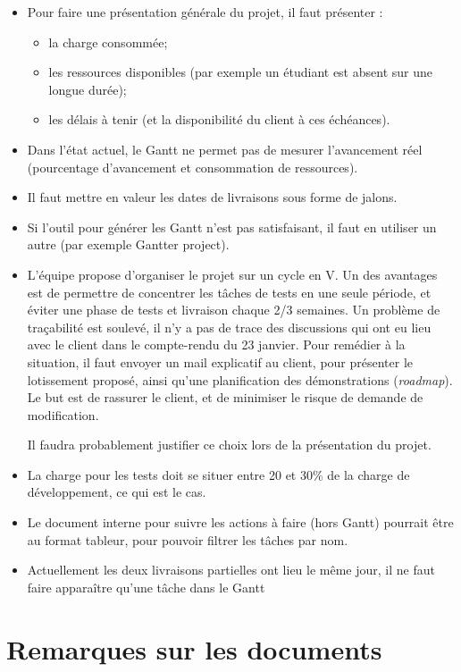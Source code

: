 \documentclass[a4paper,11pt,french]{article}
\begin{document}
\begin{itemize}
\item Pour faire une présentation générale du projet, il faut présenter :
\begin{itemize}
\item la charge consommée;
\item les ressources disponibles (par exemple un étudiant est absent sur une longue durée);
\item les délais à tenir (et la disponibilité du client à ces échéances).
\end{itemize}
\item Dans l'état actuel, le Gantt ne permet pas de mesurer l'avancement réel (pourcentage d'avancement et consommation de ressources).
\item Il faut mettre en valeur les dates de livraisons sous forme de jalons.
\item Si l'outil pour générer les Gantt n'est pas satisfaisant, il faut en utiliser un autre (par exemple Gantter project).
\item L'équipe propose d'organiser le projet sur un cycle en V. Un des avantages est de permettre de concentrer les tâches de tests en une seule période, et éviter une phase de tests et livraison chaque 2/3 semaines.
Un problème de traçabilité est soulevé, il n'y a pas de trace des discussions qui ont eu lieu avec le client dans le compte-rendu du 23 janvier.
Pour remédier à la situation, il faut envoyer un mail explicatif au client, pour présenter le lotissement proposé, ainsi qu'une planification des démonstrations (\textit{roadmap}).
Le but est de rassurer le client, et de minimiser le risque de demande de modification.

Il faudra probablement justifier ce choix lors de la présentation du projet.
\item La charge pour les tests doit se situer entre 20 et 30\% de la charge de développement, ce qui est le cas.
\item  Le document interne pour suivre les actions à faire (hors Gantt) pourrait être au format tableur, pour pouvoir filtrer les tâches par nom.
\item Actuellement les deux livraisons partielles ont lieu le même jour, il ne faut faire apparaître qu'une tâche dans le Gantt
\end{itemize}

\section{Remarques sur les documents}
\end{document}
